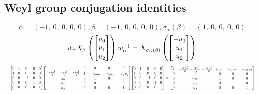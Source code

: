 \documentclass[11pt]{article}
\theoremstyle{definition}
\begin{document}
\subsection{Weyl group conjugation identities}

\providecommand{\scaletoalign}[2]{%
  \sbox0{$#2$}%
  \ifdim\wd0>#1\relax 
    \resizebox{#1}{!}{\usebox0}%
  \else 
    \usebox0%
  \fi 
}
\[
\alpha = \left( -1, \  0, \  0, \  0, \  0\right), \beta = \left( -1, \  0, \  0, \  0, \  0\right), \sigma_{\alpha}(\beta) = \left( 1, \  0, \  0, \  0, \  0\right)
\]
\[
\scaletoalign{\textwidth}{w_{\alpha} X_{\beta}\left(\left[\begin{matrix}u_{0}\\u_{1}\\u_{2}\end{matrix}\right]\right) w_{\alpha}^{-1} = X_{\sigma_{\alpha}\left(\beta\right)}\left(\left[\begin{matrix}- u_{0}\\u_{1}\\u_{2}\end{matrix}\right]\right)}
\]
\[
\scaletoalign{\textwidth}{{\left[\begin{matrix}0 & 1 & 0 & 0 & 0\\1 & 0 & 0 & 0 & 0\\0 & 0 & -1 & 0 & 0\\0 & 0 & 0 & 1 & 0\\0 & 0 & 0 & 0 & 1\end{matrix}\right]} {\left[\begin{matrix}1 & 0 & 0 & 0 & 0\\- \frac{c_{0} u_{0}^{2}}{2} - \frac{c_{1} u_{1}^{2}}{2} - \frac{c_{2} u_{2}^{2}}{2} & 1 & - c_{0} u_{0} & - c_{1} u_{1} & - c_{2} u_{2}\\u_{0} & 0 & 1 & 0 & 0\\u_{1} & 0 & 0 & 1 & 0\\u_{2} & 0 & 0 & 0 & 1\end{matrix}\right]} {\left[\begin{matrix}0 & 1 & 0 & 0 & 0\\1 & 0 & 0 & 0 & 0\\0 & 0 & -1 & 0 & 0\\0 & 0 & 0 & 1 & 0\\0 & 0 & 0 & 0 & 1\end{matrix}\right]} = {\left[\begin{matrix}1 & - \frac{c_{0} u_{0}^{2}}{2} - \frac{c_{1} u_{1}^{2}}{2} - \frac{c_{2} u_{2}^{2}}{2} & c_{0} u_{0} & - c_{1} u_{1} & - c_{2} u_{2}\\0 & 1 & 0 & 0 & 0\\0 & - u_{0} & 1 & 0 & 0\\0 & u_{1} & 0 & 1 & 0\\0 & u_{2} & 0 & 0 & 1\end{matrix}\right]}}
\]
\end{document}

